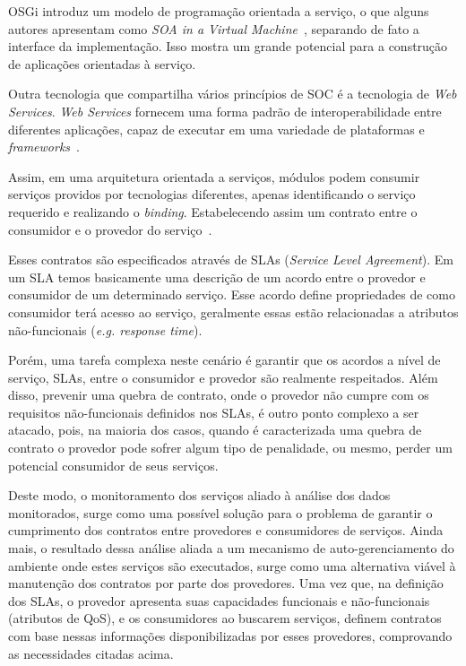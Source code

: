 OSGi introduz um modelo de programação orientada a serviço, o que alguns autores apresentam como \textit{SOA in a Virtual Machine}~\cite{hall2010osgi}, separando de fato a interface da implementação. Isso mostra um grande potencial para a construção de aplicações orientadas à serviço.

Outra tecnologia que compartilha vários princípios de SOC é a tecnologia de \textit{Web Services}. \textit{Web Services} fornecem uma forma padrão de interoperabilidade entre diferentes aplicações, capaz de executar em uma variedade de plataformas e \textit{frameworks}~\cite{w3c2002ws}.

Assim, em uma arquitetura orientada a serviços, módulos podem consumir serviços providos por tecnologias diferentes, apenas identificando o serviço requerido e realizando o \textit{binding}. Estabelecendo assim um contrato entre o consumidor e o provedor do serviço~\cite{oracle2005ws}.

Esses contratos são especificados através de SLAs (\textit{Service Level Agreement}). Em um SLA temos basicamente uma descrição de um acordo entre o provedor e consumidor de um determinado serviço. Esse acordo define propriedades de como consumidor terá acesso ao serviço, geralmente essas estão relacionadas a atributos não-funcionais (\textit{e.g. response time}).

Porém, uma tarefa complexa neste cenário é garantir que os acordos a nível de serviço, SLAs, entre o consumidor e provedor são realmente respeitados. Além disso, prevenir uma quebra de contrato, onde o provedor não cumpre com os requisitos não-funcionais definidos nos SLAs, é outro ponto complexo a ser atacado, pois, na maioria dos casos, quando é caracterizada uma quebra de contrato o provedor pode sofrer algum tipo de penalidade, ou mesmo, perder um potencial consumidor de seus serviços.

Deste modo, o monitoramento dos serviços aliado à análise dos dados monitorados, surge como uma possível solução para o problema de garantir o cumprimento dos contratos entre provedores e consumidores de serviços. Ainda mais, o resultado dessa análise aliada a um mecanismo de auto-gerenciamento do ambiente onde estes serviços são executados, surge como uma alternativa viável à manutenção dos contratos por parte dos provedores. Uma vez que, na definição dos SLAs, o provedor apresenta suas capacidades funcionais e não-funcionais (atributos de QoS), e os consumidores ao buscarem serviços, definem contratos com base nessas informações disponibilizadas por esses provedores, comprovando as necessidades citadas acima.

